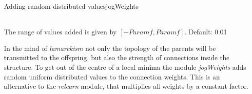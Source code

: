 \begin{moduledoc}{Adding random distributed values}{jogWeights}

\item[\KeyWord{jogLimit} \optParam{f}]~\\
The range of values added is given by $[-Param{f},Param{f}]$.
Default: 0.01


\end{moduledoc}
In the mind of {\it lamarckism} not only the topology of the parents will 
be transmitted to the offspring, but also the strength of connections inside the 
structure. To get out of the centre of a local minima 
the module {\it jogWeights} adds  random uniform distributed values to the
connection weights. This is an alternative to the {\it relearn}-module, that multiplies
all weights by a constant factor.









